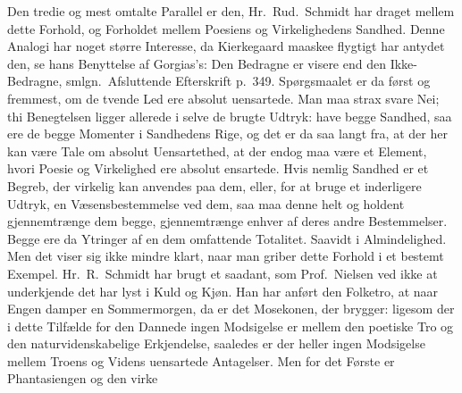 Den tredie og mest omtalte Parallel er den, Hr.\ Rud.\ Schmidt har draget
mellem dette Forhold, og Forholdet mellem Poesiens og Virkelighedens Sandhed.
Denne Analogi har noget større Interesse, da
Kierkegaard maaskee flygtigt har antydet den, se hans Benyttelse af
Gorgias's: Den Bedragne er visere end den Ikke-Bedragne, smlgn.\ Afsluttende
Efterskrift p.\ 349. Spørgsmaalet er da først og fremmest, om de tvende Led
ere absolut uensartede. Man maa strax svare Nei; thi Benegtelsen ligger
allerede i selve de brugte Udtryk: have begge Sandhed, saa ere de begge
Momenter i Sandhedens Rige, og det er da saa langt fra, at der her kan være
Tale om absolut Uensartethed, at der endog maa være et Element, hvori Poesie
og Virkelighed ere absolut ensartede. Hvis nemlig Sandhed er et Begreb, der
virkelig kan anvendes paa dem, eller, for at bruge et inderligere Udtryk, en
Væsensbestemmelse ved dem, saa maa denne helt og holdent gjennemtrænge dem
begge, gjennemtrænge enhver af deres andre Bestemmelser. Begge ere da
Ytringer af en dem omfattende Totalitet. Saavidt i Almindelighed. Men det
viser sig ikke mindre klart, naar man griber dette Forhold i et bestemt
Exempel. Hr.\ R.\ Schmidt har brugt et saadant, som Prof.\ Nielsen ved ikke
at underkjende det har lyst i Kuld og Kjøn. Han har anført den Folketro, at
naar Engen damper en Sommermorgen, da er det Mosekonen, der brygger: ligesom
der i dette Tilfælde for den Dannede ingen Modsigelse er mellem den poetiske
Tro og den naturvidenskabelige Erkjendelse, saaledes er der heller ingen
Modsigelse mellem Troens og Videns uensartede Antagelser. Men for det Første
er Phantasiengen og den virke%
